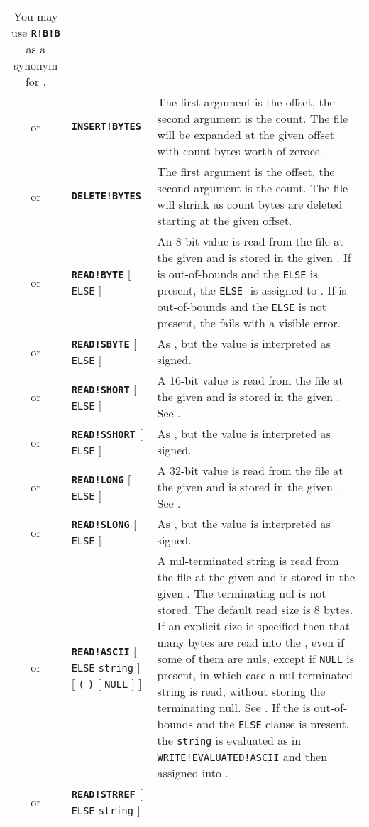 \documentclass{article}
\def\ttref#1{\ahrefloc{#1}{\tt #1}}
\def\DEFINE#1{{\tt \bf #1}\label{#1}\index{#1}}
\def\t#1{{\tt #1}}
\def\Ob{{\color{red} [ }}
\def\Oe{{\color{red} ] }}
\begin{document}
\begin{tabular}{cp{10in}|p{10in}}
  You may use \DEFINE{R!B!B} as a synonym for \ttref{REPLACE!BCS!BLOCK}.
  \\
or & \DEFINE{INSERT!BYTES} \ttref{offset} \ttref{value} &
  The first argument is the offset, the second argument is the count.
  The file will be expanded at the given offset with count bytes worth of
  zeroes. \\
or & \DEFINE{DELETE!BYTES} \ttref{offset} \ttref{value} &
  The first argument is the offset, the second argument is the count.
  The file will shrink as count bytes are deleted starting at the given
  offset. \\
or & \DEFINE{READ!BYTE} \ttref{offset} \ttref{variable} \Ob \t{ELSE}
\ttref{value} \Oe &
  An 8-bit value is read from the file at the given \ttref{offset} and is stored
  in the given \ttref{variable}. If \ttref{offset} is out-of-bounds and the
  \t{ELSE} is present, the \t{ELSE}-\ttref{value} is assigned to
  \ttref{variable}. If \ttref{offset} is out-of-bounds and the \t{ELSE} is
  not present, the \ttref{patch} fails with a visible error.  \\
or & \DEFINE{READ!SBYTE} \ttref{offset} \ttref{variable} \Ob \t{ELSE}
\ttref{value} \Oe &
  As \ttref{READ!BYTE}, but the value is interpreted as signed. \\
or & \DEFINE{READ!SHORT} \ttref{offset} \ttref{variable} \Ob \t{ELSE}
\ttref{value} \Oe &
  A 16-bit value is read from the file at the given \ttref{offset} and is
  stored in the given \ttref{variable}. See \ttref{READ!BYTE}. \\
or & \DEFINE{READ!SSHORT} \ttref{offset} \ttref{variable} \Ob \t{ELSE}
\ttref{value} \Oe &
  As \ttref{READ!SHORT}, but the value is interpreted as signed. \\
or & \DEFINE{READ!LONG} \ttref{offset} \ttref{variable} \Ob \t{ELSE}
\ttref{value} \Oe &
  A 32-bit value is read from the file at the given \ttref{offset}
  and is stored in the given \ttref{variable}. See \ttref{READ!BYTE}. \\
or & \DEFINE{READ!SLONG} \ttref{offset} \ttref{variable} \Ob \t{ELSE}
\ttref{value} \Oe &
  As \ttref{READ!LONG}, but the value is interpreted as signed. \\
or & \DEFINE{READ!ASCII} \ttref{offset} \ttref{variable} \Ob \t{ELSE}
  \t{string} \Oe \Ob \t{(} \ttref{value} \t{)} \Ob \t{NULL} \Oe \Oe &
    A nul-terminated string is read from the file at
    the given \ttref{offset} and is stored in the given \ttref{variable}.
    The terminating nul is not stored. The default read size is 8 bytes.
    If an explicit size \ttref{value} is specified then that many bytes are read
    into the \ttref{variable}, even if some of them are nuls, except if \t{NULL}
    is present, in which case a nul-terminated string is read, without storing
    the terminating null. See
  \ttref{READ!BYTE}.  If the \ttref{offset} is out-of-bounds and the
  \t{ELSE} clause is present, the \t{string} is evaluated as in
  \t{WRITE!EVALUATED!ASCII} and then assigned into \ttref{variable}.
  \\
or & \DEFINE{READ!STRREF} \ttref{offset} \ttref{variable} \Ob \t{ELSE}
\t{string} \Oe &


\end{tabular}
\end{document}
